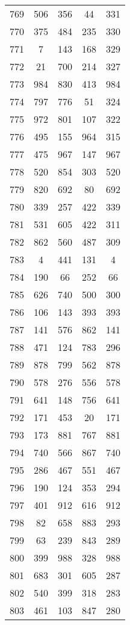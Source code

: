 \documentclass[a4paper,10pt,ngerman]{scrartcl}
\begin{document}
\begin{longtable}[c]{c|c|c|c|c}
    769 & 506 & 356 & 44 & 331 \\
    770 & 375 & 484 & 235 & 330 \\
    771 & 7 & 143 & 168 & 329 \\
    772 & 21 & 700 & 214 & 327 \\
    773 & 984 & 830 & 413 & 984 \\
    774 & 797 & 776 & 51 & 324 \\
    775 & 972 & 801 & 107 & 322 \\
    776 & 495 & 155 & 964 & 315 \\
    777 & 475 & 967 & 147 & 967 \\
    778 & 520 & 854 & 303 & 520 \\
    779 & 820 & 692 & 80 & 692 \\
    780 & 339 & 257 & 422 & 339 \\
    781 & 531 & 605 & 422 & 311 \\
    782 & 862 & 560 & 487 & 309 \\
    783 & 4 & 441 & 131 & 4 \\
    784 & 190 & 66 & 252 & 66 \\
    785 & 626 & 740 & 500 & 300 \\
    786 & 106 & 143 & 393 & 393 \\
    787 & 141 & 576 & 862 & 141 \\
    788 & 471 & 124 & 783 & 296 \\
    789 & 878 & 799 & 562 & 878 \\
    790 & 578 & 276 & 556 & 578 \\
    791 & 641 & 148 & 756 & 641 \\
    792 & 171 & 453 & 20 & 171 \\
    793 & 173 & 881 & 767 & 881 \\
    794 & 740 & 566 & 867 & 740 \\
    795 & 286 & 467 & 551 & 467 \\
    796 & 190 & 124 & 353 & 294 \\
    797 & 401 & 912 & 616 & 912 \\
    798 & 82 & 658 & 883 & 293 \\
    799 & 63 & 239 & 843 & 289 \\
    800 & 399 & 988 & 328 & 988 \\
    801 & 683 & 301 & 605 & 287 \\
    802 & 540 & 399 & 318 & 283 \\
    803 & 461 & 103 & 847 & 280 \\

\end{longtable}
\end{document}
